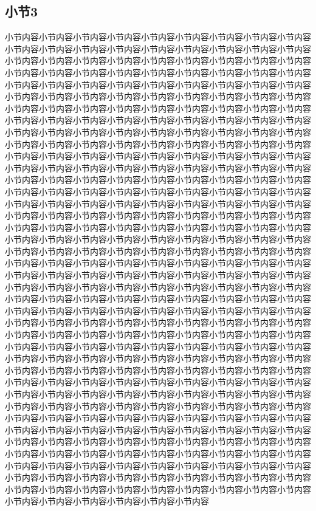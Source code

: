\documentclass[a4paper, 12pt, oneside]{article}
\theoremstyle{cn_theorem}
\begin{document}
\subsection{小节3}
小节内容小节内容小节内容小节内容小节内容小节内容小节内容小节内容小节内容小节内容小节内容小节内容小节内容小节内容小节内容小节内容小节内容小节内容小节内容小节内容小节内容小节内容小节内容小节内容小节内容小节内容小节内容小节内容小节内容小节内容小节内容小节内容小节内容小节内容小节内容小节内容小节内容小节内容小节内容小节内容小节内容小节内容小节内容小节内容小节内容小节内容小节内容小节内容小节内容小节内容小节内容小节内容小节内容小节内容小节内容小节内容小节内容小节内容小节内容小节内容小节内容小节内容小节内容小节内容小节内容小节内容小节内容小节内容小节内容小节内容小节内容小节内容小节内容小节内容小节内容小节内容小节内容小节内容小节内容小节内容小节内容小节内容小节内容小节内容小节内容小节内容小节内容小节内容小节内容小节内容小节内容小节内容小节内容小节内容小节内容小节内容小节内容小节内容小节内容小节内容小节内容小节内容小节内容小节内容小节内容小节内容小节内容小节内容小节内容小节内容小节内容小节内容小节内容小节内容小节内容小节内容小节内容小节内容小节内容小节内容小节内容小节内容小节内容小节内容小节内容小节内容小节内容小节内容小节内容小节内容小节内容小节内容小节内容小节内容小节内容小节内容小节内容小节内容小节内容小节内容小节内容小节内容小节内容小节内容小节内容小节内容小节内容小节内容小节内容小节内容小节内容小节内容小节内容小节内容小节内容小节内容小节内容小节内容小节内容小节内容小节内容小节内容小节内容小节内容小节内容小节内容小节内容小节内容小节内容小节内容小节内容小节内容小节内容小节内容小节内容小节内容小节内容小节内容小节内容小节内容小节内容小节内容小节内容小节内容小节内容小节内容小节内容小节内容小节内容小节内容小节内容小节内容小节内容小节内容小节内容小节内容小节内容小节内容小节内容小节内容小节内容小节内容小节内容小节内容小节内容小节内容小节内容小节内容小节内容小节内容小节内容小节内容小节内容小节内容小节内容小节内容小节内容小节内容小节内容小节内容小节内容小节内容小节内容小节内容小节内容小节内容小节内容小节内容小节内容小节内容小节内容小节内容小节内容小节内容小节内容小节内容小节内容小节内容小节内容小节内容小节内容小节内容小节内容小节内容小节内容小节内容小节内容小节内容小节内容小节内容小节内容小节内容小节内容小节内容小节内容小节内容小节内容小节内容小节内容小节内容小节内容小节内容小节内容小节内容小节内容小节内容小节内容小节内容小节内容小节内容小节内容小节内容小节内容小节内容小节内容小节内容小节内容小节内容小节内容小节内容小节内容小节内容小节内容小节内容小节内容小节内容小节内容小节内容小节内容小节内容小节内容小节内容小节内容小节内容小节内容小节内容小节内容小节内容小节内容小节内容小节内容小节内容小节内容小节内容小节内容小节内容小节内容小节内容小节内容小节内容小节内容小节内容小节内容小节内容小节内容小节内容小节内容小节内容小节内容小节内容小节内容小节内容小节内容小节内容小节内容小节内容小节内容小节内容小节内容小节内容小节内容小节内容小节内容小节内容小节内容小节内容小节内容小节内容小节内容小节内容小节内容小节内容小节内容小节内容小节内容小节内容小节内容小节内容小节内容小节内容小节内容小节内容小节内容小节内容小节内容小节内容小节内容
\end{document}
